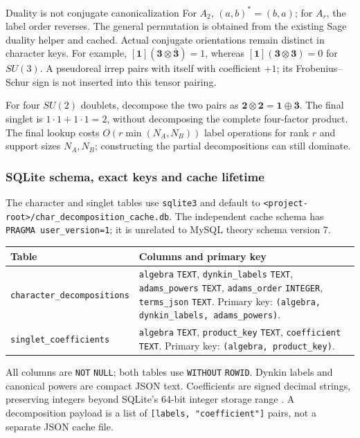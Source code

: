 \documentclass[11pt,a4paper]{article}
\numberwithin{equation}{section}
\newcommand{\code}[1]{{\small\nolinkurl{#1}}}
\begin{document}
\begin{note}{Duality is not conjugate canonicalization}
For $A_2$, $(a,b)^*=(b,a)$; for $A_r$, the label order reverses. The general
permutation is obtained from the existing Sage duality helper and cached.
Actual conjugate orientations remain distinct in character keys. For example,
$[\mathbf1](\mathbf3\otimes\overline{\mathbf3})=1$, whereas
$[\mathbf1](\mathbf3\otimes\mathbf3)=0$ for $SU(3)$.
A pseudoreal irrep pairs with itself with coefficient $+1$; its
Frobenius--Schur sign is not inserted into this tensor pairing.
\end{note}
For four $SU(2)$ doublets, decompose the two pairs as
$\mathbf2\otimes\mathbf2=\mathbf1\oplus\mathbf3$. The final singlet is
$1\cdot1+1\cdot1=2$, without decomposing the complete four-factor product.
The final lookup costs $O(r\min(N_A,N_B))$ label operations for rank $r$ and
support sizes $N_A,N_B$; constructing the partial decompositions can still dominate.

\clearpage
\subsubsection{SQLite schema, exact keys and cache lifetime}
The character and singlet tables use \code{sqlite3} and default to
\code{<project-root>/char_decomposition_cache.db}. The independent cache schema
has \code{PRAGMA user_version=1}; it is unrelated to MySQL theory schema version 7.
\begin{tabularx}{\textwidth}{@{}p{49mm}Y@{}}
\toprule Table & Columns and primary key\\\midrule
\code{character_decompositions} & \code{algebra} \code{TEXT},
\code{dynkin_labels} \code{TEXT}, \code{adams_powers} \code{TEXT},
\code{adams_order} \code{INTEGER}, \code{terms_json} \code{TEXT}.\newline
Primary key: \code{(algebra, dynkin_labels, adams_powers)}.\\[4pt]
\code{singlet_coefficients} & \code{algebra} \code{TEXT},
\code{product_key} \code{TEXT}, \code{coefficient} \code{TEXT}.\newline
Primary key: \code{(algebra, product_key)}.\\\bottomrule
\end{tabularx}
All columns are \code{NOT} \code{NULL}; both tables use \code{WITHOUT} \code{ROWID}.
Dynkin labels and canonical powers are compact JSON text. Coefficients are signed
decimal strings, preserving integers beyond SQLite's 64-bit integer storage
range \cite{sqlite-types}. A decomposition payload is a list of
\code{[labels, "coefficient"]} pairs, not a separate JSON cache file.
\end{document}
